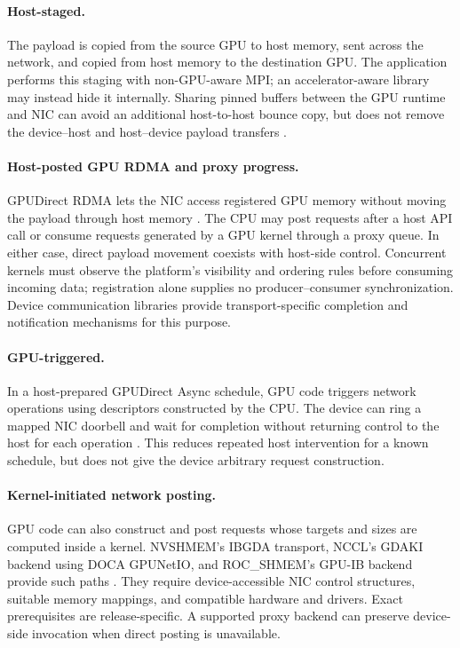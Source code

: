 \paragraph{Host-staged.} The payload is copied from the source GPU to host memory, sent across the network, and copied from host memory to the destination GPU. The application performs this staging with non-GPU-aware MPI; an accelerator-aware library may instead hide it internally. Sharing pinned buffers between the GPU runtime and NIC can avoid an additional host-to-host bounce copy, but does not remove the device--host and host--device payload transfers \cite{unat_landscape_2026}.

\paragraph{Host-posted GPU RDMA and proxy progress.} GPUDirect RDMA lets the NIC access registered GPU memory without moving the payload through host memory \cite{unat_landscape_2026,hamidouche_gpu-initiated_2025}. The CPU may post requests after a host API call or consume requests generated by a GPU kernel through a proxy queue. In either case, direct payload movement coexists with host-side control. Concurrent kernels must observe the platform's visibility and ordering rules before consuming incoming data; registration alone supplies no producer--consumer synchronization. Device communication libraries provide transport-specific completion and notification mechanisms for this purpose.

\paragraph{GPU-triggered.} In a host-prepared GPUDirect Async schedule, GPU code triggers network operations using descriptors constructed by the CPU. The device can ring a mapped NIC doorbell and wait for completion without returning control to the host for each operation \cite{agostini_gpudirect_2018,hamidouche_gpu-initiated_2025}. This reduces repeated host intervention for a known schedule, but does not give the device arbitrary request construction.

\paragraph{Kernel-initiated network posting.} GPU code can also construct and post requests whose targets and sizes are computed inside a kernel. NVSHMEM's IBGDA transport, NCCL's GDAKI backend using \ac{DOCA} GPUNetIO, and ROC\_SHMEM's GPU-IB backend provide such paths \cite{unat_landscape_2026,hamidouche_kernel-initiated_2026}. They require device-accessible NIC control structures, suitable memory mappings, and compatible hardware and drivers. Exact prerequisites are release-specific. A supported proxy backend can preserve device-side invocation when direct posting is unavailable.

